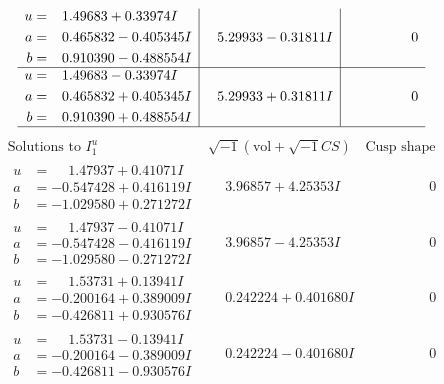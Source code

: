 \documentclass[1p]{elsarticle_modified}
\theoremstyle{definition}
\newcommand{\I}{\sqrt{-1}}
\begin{document}
$$\begin{array}{c|c|c}
\begin{aligned}
u &= \phantom{-}1.49683 + 0.33974 I \\
a &= \phantom{-}0.465832 - 0.405345 I \\
b &= \phantom{-}0.910390 - 0.488554 I\end{aligned}
 & \phantom{-}5.29933 - 0.31811 I & \phantom{-0.000000 } 0 \\ \hline\begin{aligned}
u &= \phantom{-}1.49683 - 0.33974 I \\
a &= \phantom{-}0.465832 + 0.405345 I \\
b &= \phantom{-}0.910390 + 0.488554 I\end{aligned}
 & \phantom{-}5.29933 + 0.31811 I & \phantom{-0.000000 } 0\\
 \hline 
 \end{array}$$\newpage$$\begin{array}{c|c|c}  
\text{Solutions to }I^u_{1}& \I (\text{vol} + \sqrt{-1}CS) & \text{Cusp shape}\\
 \hline 
\begin{aligned}
u &= \phantom{-}1.47937 + 0.41071 I \\
a &= -0.547428 + 0.416119 I \\
b &= -1.029580 + 0.271272 I\end{aligned}
 & \phantom{-}3.96857 + 4.25353 I & \phantom{-0.000000 } 0 \\ \hline\begin{aligned}
u &= \phantom{-}1.47937 - 0.41071 I \\
a &= -0.547428 - 0.416119 I \\
b &= -1.029580 - 0.271272 I\end{aligned}
 & \phantom{-}3.96857 - 4.25353 I & \phantom{-0.000000 } 0 \\ \hline\begin{aligned}
u &= \phantom{-}1.53731 + 0.13941 I \\
a &= -0.200164 + 0.389009 I \\
b &= -0.426811 + 0.930576 I\end{aligned}
 & \phantom{-}0.242224 + 0.401680 I & \phantom{-0.000000 } 0 \\ \hline\begin{aligned}
u &= \phantom{-}1.53731 - 0.13941 I \\
a &= -0.200164 - 0.389009 I \\
b &= -0.426811 - 0.930576 I\end{aligned}
 & \phantom{-}0.242224 - 0.401680 I & \phantom{-0.000000 } 0 \\ \hline\begin{aligned}

\end{aligned}
\end{array}$$
\end{document}
